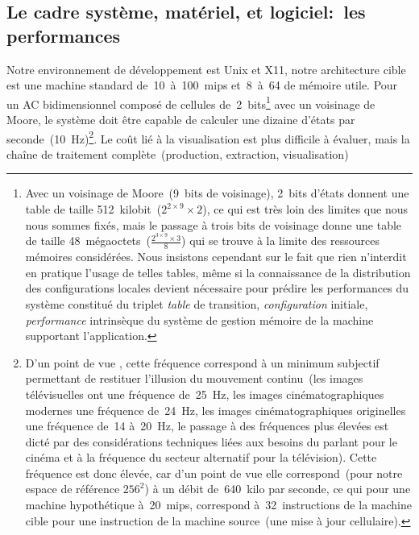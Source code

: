 \subsection*{Le cadre système, matériel, et logiciel:~les performances}

Notre environnement de développement est Unix et X11, notre
architecture cible est une machine standard de~10~à~100~mips
et~8~à~64  %
de mémoire utile. %
Pour un AC bidimensionnel composé de 
cellules de~2~bits\footnote{%
  Avec un voisinage de Moore~(9~bits de voisinage), 2~bits d'états
  donnent une table de taille 512~kilobit~($2^{2 \times  9} \times  2$), ce qui
  est très loin des limites que nous nous sommes fixés, mais le passage
  à trois bits de voisinage donne une table de taille
  48~mégaoctets~($\frac{2^{3 \times  9} \times  3}{8}$) qui se trouve à la limite
  des ressources mémoires considérées. %
  Nous insistons cependant sur le fait que rien n'interdit en pratique
  l'usage de telles tables, même si la connaissance de la
  distribution des configurations locales devient nécessaire pour
  prédire les performances du système constitué du triplet
  \emph{table} de transition, \emph{configuration} initiale,
  \emph{performance} intrinsèque du système de gestion mémoire de la
  machine supportant l'application.} %
avec un voisinage de Moore, le système doit être capable de calculer
une dizaine d'états par seconde~(10~Hz)\footnote{%
  D'un point de vue , cette fréquence correspond à
  un minimum subjectif permettant de restituer l'illusion du mouvement
  continu~(les images télévisuelles ont une fréquence de~25~Hz, les
  images cinématographiques modernes une fréquence de~24~Hz, les
  images cinématographiques originelles une fréquence de~14 à~20~Hz,
  le passage à des fréquences plus élevées est dicté par des
  considérations techniques liées aux besoins du parlant pour le cinéma
  et à la fréquence du secteur alternatif pour la télévision). %
  Cette fréquence est donc élevée, car d'un point de vue
   elle correspond~(pour notre espace de référence
  $256^2$) à un débit de~640~kilo  par
  seconde, ce qui pour une machine hypothétique à~20~mips, correspond
  à~32~instructions de la machine cible pour une instruction de la
  machine source~(une mise à jour cellulaire).}. %
Le coût lié à la visualisation est plus difficile à évaluer, mais la
chaîne de traitement complète~(production, extraction, visualisation)
